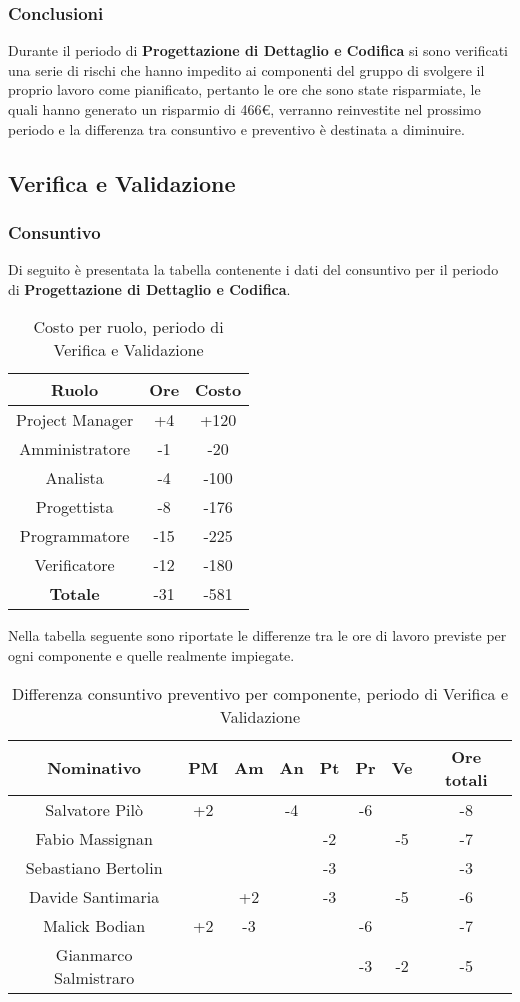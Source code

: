 		\subsubsection{Conclusioni}
		Durante il periodo di \textbf{Progettazione di Dettaglio e Codifica} si sono verificati una serie di rischi che hanno impedito ai componenti del gruppo di svolgere il proprio lavoro come pianificato, pertanto le ore che sono state risparmiate, le quali hanno generato un risparmio di 466€, verranno reinvestite nel prossimo periodo e la differenza tra consuntivo e preventivo è destinata a diminuire.
	\subsection{Verifica e Validazione}
	\subsubsection{Consuntivo}
		Di seguito è presentata la tabella contenente i dati del consuntivo per il periodo di \textbf{Progettazione di Dettaglio e Codifica}.
	\begin{table}[H]
		\centering
		\begin{tabular}{|c|c|c|}
			\hline
			\textbf{Ruolo}		& \textbf{Ore}	& \textbf{Costo} \\
			\hline
			Project Manager		& +4		& +120 \\
			Amministratore		& -1  		& -20 \\
			Analista			& -4		& -100 \\
			Progettista			& -8 		& -176 \\
			Programmatore		& -15 		& -225 \\
			Verificatore		& -12  		& -180 \\
			\hline
			\textbf{Totale}		& -31  		& -581 \\
			\hline
		\end{tabular}
		\caption{Costo per ruolo, periodo di Verifica e Validazione}
	\end{table}
	Nella tabella seguente sono riportate le differenze tra le ore di lavoro previste per ogni componente e quelle realmente impiegate.
	\begin{table}[H]
		\centering
		\begin{tabular}{|c|c|c|c|c|c|c|c|}
			\hline
			\textbf{Nominativo}		& \textbf{PM}	& \textbf{Am}	& \textbf{An}	& \textbf{Pt}	& \textbf{Pr}	& \textbf{Ve}	& \textbf{Ore totali}     \\
			\hline
			Salvatore Pilò			& +2	& 		& -4	&   	& -6	&   	& -8 \\
			Fabio Massignan			& 		& 		&   	& -2	&   	& -5	& -7 \\
			Sebastiano Bertolin		&		& 	 	& 		& -3  	& 		&		& -3 \\
			Davide Santimaria		&		& +2	&		& -3	&   	& -5	& -6 \\
			Malick Bodian			& +2	& -3  	& 		&   	& -6	&   	& -7 \\
			Gianmarco Salmistraro	&		&		& 	 	&		& -3  	& -2	& -5 \\
			\hline
		\end{tabular}
		\caption{Differenza consuntivo preventivo per componente, periodo di Verifica e Validazione}
	\end{table}
